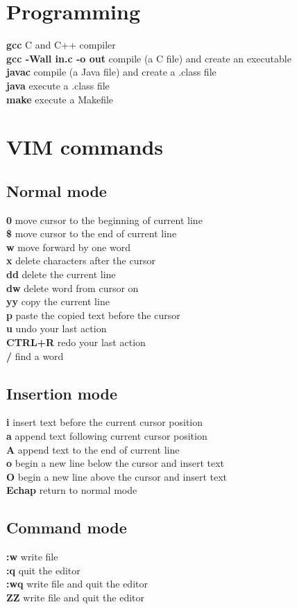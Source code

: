\documentclass[11pt]{article}
\newcommand{\command}[2]{\textsf{\textbf{#1}} \dotfill{} #2}
\begin{document}
\begin{multicols*}{2}
\section{Programming}

\command{gcc}{C and C++ compiler}\\
\command{gcc -Wall in.c -o out}{compile (a C file) and create an executable}\\
\command{javac}{compile (a Java file) and create a .class file}\\
\command{java}{execute a .class file}\\
\command{make}{execute a Makefile}


\section{VIM commands}

\subsection{Normal mode}

\command{0}{move cursor to the beginning of current line}\\
\command{\$}{move cursor to the end of current line}\\
\command{w}{move forward by one word}\\
\command{x}{delete characters after the cursor}\\
\command{dd}{delete the current line}\\
\command{dw}{delete word from cursor on}\\
\command{yy}{copy the current line}\\
\command{p}{paste the copied text before the cursor}\\
\command{u}{undo your last action}\\
\command{CTRL+R}{redo your last action}\\
\command{/}{find a word}

\subsection{Insertion mode}

\command{i}{insert text before the current cursor position}\\
\command{a}{append text following current cursor position}\\
\command{A}{append text to the end of current line}\\
\command{o}{begin a new line below the cursor and insert text}\\
\command{O}{begin a new line above the cursor and insert text}\\
\command{Echap}{return to normal mode}

\subsection{Command mode}

\command{:w}{write file}\\
\command{:q}{quit the editor}\\
\command{:wq}{write file and quit the editor}\\
\command{ZZ}{write file and quit the editor}


\end{multicols*}
\end{document}
